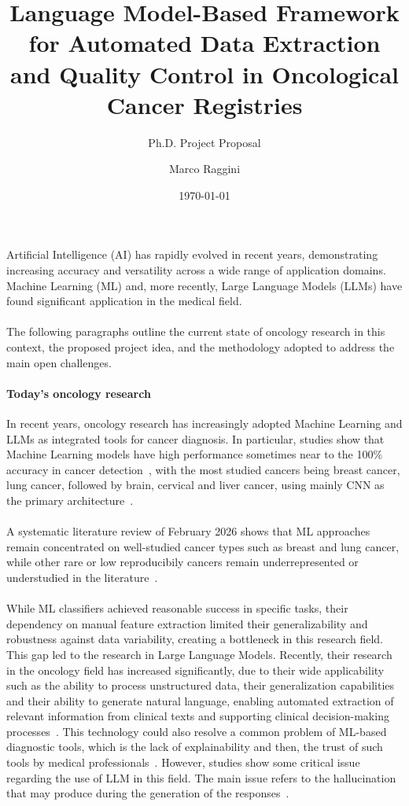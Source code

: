 \documentclass[11pt]{scrartcl}
\title{\LARGE
    Language Model-Based Framework for Automated Data Extraction and Quality Control in Oncological Cancer Registries
}
\subtitle{Ph.D. Project Proposal}
\author{
    Marco Raggini
}
\date{
    \today
}
\begin{document}
\maketitle
Artificial Intelligence (AI) has rapidly evolved in recent years, demonstrating increasing accuracy and versatility across a wide range of application domains. Machine Learning (ML) and, more recently, Large Language Models (LLMs) have found significant application in the medical field.
\\\\
The following paragraphs outline the current state of oncology research in this context, the proposed project idea, and the methodology adopted to address the main open challenges.
\paragraph{Today's oncology research}{In recent years, oncology research has increasingly adopted Machine Learning and LLMs as integrated tools for cancer diagnosis. In particular, studies show that Machine Learning models have high performance sometimes near to the 100\% accuracy in cancer detection~\cite{Tandon2024}, with the most studied cancers being breast cancer, lung cancer, followed by brain, cervical and liver cancer, using mainly CNN as the primary architecture~\cite{Tandon2024}. 
\\\\
A systematic literature review of February 2026 shows that ML approaches remain concentrated on well-studied cancer types such as breast and lung cancer, while other rare or low reproducibily cancers remain underrepresented or understudied in the literature~\cite{rosca2026}. 
\\\\
While ML classifiers achieved reasonable success in specific tasks, their dependency on manual feature extraction limited their generalizability and robustness against data variability, creating a bottleneck in this research field. This gap led to the research in Large Language Models. Recently, their research in the oncology field has increased significantly, due to their wide applicability such as the ability to process unstructured data, their generalization capabilities and their ability to generate natural language, enabling automated extraction of relevant information from clinical texts and supporting clinical decision-making processes~\cite{rahman2026}. 
This technology could also resolve a common problem of ML-based diagnostic tools, which is the lack of explainability and then, the trust of such tools by medical professionals~\cite{rahman2026}. However, studies show some critical issue regarding the use of LLM in this field. The main issue refers to the hallucination that may produce during the generation of the responses~\cite{rahman2026}.}
\end{document}
